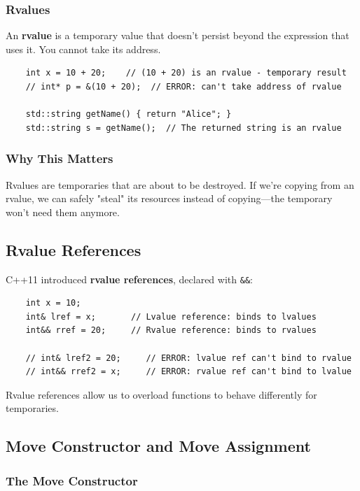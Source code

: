 \subsubsection{Rvalues}

An \textbf{rvalue} is a temporary value that doesn't persist beyond the expression that uses it. You cannot take its address.

\begin{lstlisting}
	int x = 10 + 20;    // (10 + 20) is an rvalue - temporary result
	// int* p = &(10 + 20);  // ERROR: can't take address of rvalue
	
	std::string getName() { return "Alice"; }
	std::string s = getName();  // The returned string is an rvalue
\end{lstlisting}

\subsubsection{Why This Matters}

Rvalues are temporaries that are about to be destroyed. If we're copying from an rvalue, we can safely "steal" its resources instead of copying—the temporary won't need them anymore.

\subsection{Rvalue References}

C++11 introduced \textbf{rvalue references}, declared with \texttt{\&\&}:

\begin{lstlisting}
	int x = 10;
	int& lref = x;       // Lvalue reference: binds to lvalues
	int&& rref = 20;     // Rvalue reference: binds to rvalues
	
	// int& lref2 = 20;     // ERROR: lvalue ref can't bind to rvalue
	// int&& rref2 = x;     // ERROR: rvalue ref can't bind to lvalue
\end{lstlisting}

Rvalue references allow us to overload functions to behave differently for temporaries.

\subsection{Move Constructor and Move Assignment}

\subsubsection{The Move Constructor}


